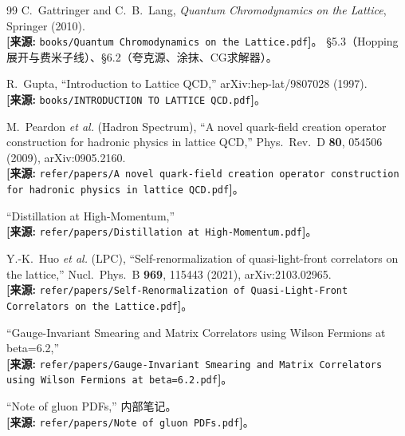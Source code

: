 \documentclass[12pt,a4paper]{ctexart}
\theoremstyle{definition}
\begin{document}
\begin{thebibliography}{99}
C.~Gattringer and C.~B.~Lang,
\textit{Quantum Chromodynamics on the Lattice}, Springer (2010).
\\\textbf{[来源:} \texttt{books/Quantum Chromodynamics on the Lattice.pdf}\textbf{]}。
§5.3（Hopping展开与费米子线）、§6.2（夸克源、涂抹、CG求解器）。

R.~Gupta, ``Introduction to Lattice QCD,'' arXiv:hep-lat/9807028 (1997).
\\\textbf{[来源:} \texttt{books/INTRODUCTION TO LATTICE QCD.pdf}\textbf{]}。

M.~Peardon \textit{et al.} (Hadron Spectrum),
``A novel quark-field creation operator construction for hadronic physics in lattice QCD,''
Phys.\ Rev.\ D \textbf{80}, 054506 (2009), arXiv:0905.2160.
\\\textbf{[来源:} \texttt{refer/papers/A novel quark-field creation operator construction for hadronic physics in lattice QCD.pdf}\textbf{]}。

``Distillation at High-Momentum,''
\\\textbf{[来源:} \texttt{refer/papers/Distillation at High-Momentum.pdf}\textbf{]}。

Y.-K.~Huo \textit{et al.} (LPC),
``Self-renormalization of quasi-light-front correlators on the lattice,''
Nucl.\ Phys.\ B \textbf{969}, 115443 (2021), arXiv:2103.02965.
\\\textbf{[来源:} \texttt{refer/papers/Self-Renormalization of Quasi-Light-Front Correlators on the Lattice.pdf}\textbf{]}。

``Gauge-Invariant Smearing and Matrix Correlators using Wilson Fermions at beta=6.2,''
\\\textbf{[来源:} \texttt{refer/papers/Gauge-Invariant Smearing and Matrix Correlators using Wilson Fermions at beta=6.2.pdf}\textbf{]}。

``Note of gluon PDFs,'' 内部笔记。
\\\textbf{[来源:} \texttt{refer/papers/Note of gluon PDFs.pdf}\textbf{]}。
\end{thebibliography}
\end{document}
